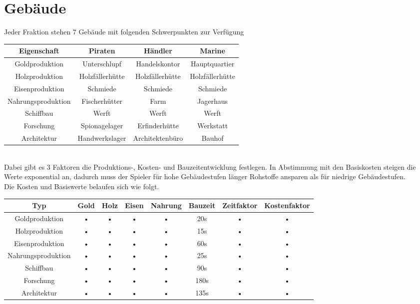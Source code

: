 \documentclass[10pt,a4paper]{article}
\begin{document}
\section{Gebäude}
Jeder Fraktion stehen 7 Gebäude mit folgenden Schwerpunkten zur Verfügung 
\\[3mm]
\begin{tabular}{|c|c|c|c|}

\hline
Eigenschaft & Piraten & Händler & Marine  \\
\hline 
Goldproduktion & Unterschlupf & Handelskontor & Hauptquartier \\ 
\hline
Holzproduktion & Holzfällerhütte & Holzfällerhütte & Holzfällerhütte \\ 
\hline
Eisenproduktion  & Schmiede & Schmiede & Schmiede \\ 
\hline 
Nahrungsproduktion & Fischerhütter & Farm & Jagerhaus \\ 
\hline 
Schiffbau & Werft & Werft & Werft \\ 
\hline 
Forschung & Spionagelager & Erfinderhütte & Werkstatt \\ 
\hline 
Architektur & Handwerkslager & Architektenbüro & Bauhof \\ 
\hline  
\end{tabular} 
\\[3mm]
Dabei gibt es 3 Faktoren die Produktions-, Kosten- und Bauzeitentwicklung festlegen. In Abstimmung mit den Basiskosten steigen die Werte exponential an, dadurch muss der Spieler für hohe Gebäudestufen länger Rohstoffe ansparen als für niedrige Gebäudestufen.
\\[3mm]
Die Kosten und Basiswerte belaufen sich wie folgt.
\\[3mm]
\begin{tabular}{|c|c|c|c|c|c|c|c|}
\hline 
Typ & Gold & Holz & Eisen & Nahrung & Bauzeit & Zeitfaktor & Kostenfaktor \\ 
\hline 
Goldproduktion & • & • & • & • & 20s & • & • \\ 
\hline 
Holzproduktion & • & • & • & • & 15s & • & • \\ 
\hline 
Eisenproduktion & • & • & • & • & 60s & • & • \\ 
\hline 
Nahrungsproduktion & • & • & • & • & 25s & • & • \\ 
\hline 
Schiffbau & • & • & • & • & 90s & • & • \\ 
\hline 
Forschung & • & • & • & • & 180s & • & • \\ 
\hline 
Architektur & • & • & • & • & 135s & • & • \\ 
\hline 
\end{tabular} 
\end{document}

